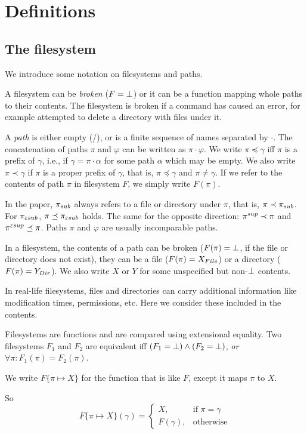 \section{Definitions}
\label{theorem:def}
\subsection{The filesystem}
We introduce some notation on filesystems and paths.

A filesystem can be \emph{broken} (\(F=\bot\))
or it can be a function mapping whole paths to their
contents. The filesystem is broken if a command has caused an error, for
example attempted to delete a directory with files under it.

A \emph{path} is either empty (/), or is a finite sequence of names
separated by \(\cdot\). The concatenation of paths \(\pi\) and
\(\varphi\) can be written as \(\pi\cdot\varphi\).
We write
\(\pi\preceq\gamma\) iff \(\pi\) is a prefix of \(\gamma\), i.e., if
\(\gamma=\pi\cdot\alpha\) for some path \(\alpha\) which may be
empty. We also write
\(\pi\prec\gamma\) if \(\pi\) is a proper prefix of \(\gamma\), that is,
\(\pi\preceq\gamma\) and \(\pi\ne\gamma\). If we refer to the contents of
path \(\pi\) in filesystem \(F\), we simply write \(F(\pi)\).

In the paper, \(\pi_{sub}\) always refers to a file or directory under
\(\pi\), that is, \(\pi\prec\pi_{sub}\). For \(\pi_{\varepsilon sub}\),
\(\pi\preceq\pi_{\varepsilon sub}\) holds. The same for the opposite direction:
\(\pi^{sup}\prec\pi\) and \(\pi^{\varepsilon sup}\preceq\pi\). Paths \(\pi\) and
\(\varphi\) are usually incomparable paths.

In a filesystem, the contents of a path can be broken (\(F(\pi)=\bot\),
if the file or directory does not exist), they can be
a file (\(F(\pi)=X_{File}\)) or a directory (\(F(\pi)=Y_{Dir}\)).  
We also write \(X\) or \(Y\) for some unspecified but non-\(\bot\)
contents.
\begin{notrsi} 
In real-life filesystems, files and directories can carry additional information
like modification times, permissions, etc.
Here we consider these included in the contents. 
\end{notrsi}

Filesystems are functions and are compared using extensional equality.
Two filesystems \(F_1\) and \(F_2\) are equivalent iff
\((F_1=\bot)\wedge(F_2=\bot)\),
\emph{or} \(\forall\pi: F_1(\pi)=F_2(\pi)\).

We write \(F\{\pi \mapsto X\}\) for the function that is like \(F\),
except it maps \(\pi\) to \(X\).
\begin{notrsi}
So
\[F\{\pi \mapsto X\}(\gamma)=
\begin{cases}
X,&\mbox{if $\pi=\gamma$}\\
F(\gamma), &\mbox{otherwise}
\end{cases}\]
\end{notrsi}

